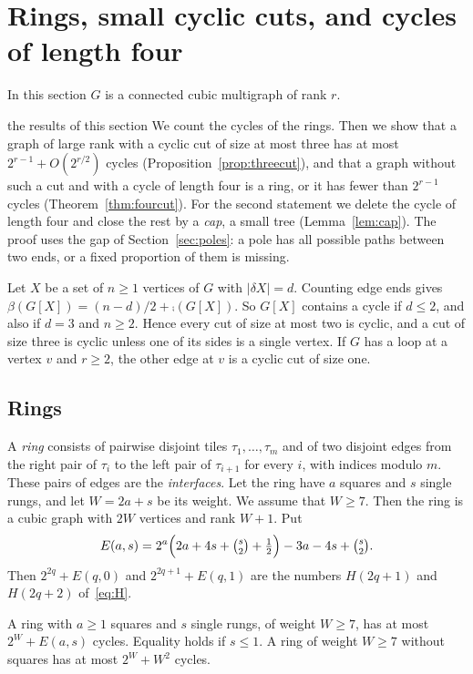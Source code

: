 \section{Rings, small cyclic cuts, and cycles of length four}\label{sec:cuts}

In this section $G$ is a connected cubic multigraph of rank $r$.

\begin{idea}{the results of this section}
We count the cycles of the rings. Then we show that a graph of large rank with a cyclic cut of
size at most three has at most $2^{r-1}+O(2^{r/2})$ cycles (Proposition~\ref{prop:threecut}), and
that a graph without such a cut and with a cycle of length four is a ring, or it has fewer than
$2^{r-1}$ cycles (Theorem~\ref{thm:fourcut}). For the second statement we delete the cycle of
length four and close the rest by a \emph{cap}, a small tree
(Lemma~\ref{lem:cap}). The proof uses the gap of Section~\ref{sec:poles}: a pole has all
possible paths between two ends, or a fixed proportion of them is missing.
\end{idea}

Let $X$ be a set of $n\ge1$ vertices of $G$ with $|\delta X|=d$. Counting edge ends gives
$\beta(G[X])=(n-d)/2+\comp(G[X])$. So $G[X]$ contains a cycle if $d\le2$, and also if $d=3$ and
$n\ge2$. Hence every cut of size at most two is cyclic, and a cut of size three is cyclic unless
one of its sides is a single vertex. If $G$ has a loop at a vertex $v$ and $r\ge2$, the other
edge at $v$ is a cyclic cut of size one.

\subsection{Rings}\label{sec:rings}

A \emph{ring} consists of pairwise disjoint tiles $\tau_1,\dots,\tau_m$ and of two disjoint edges
from the right pair of $\tau_i$ to the left pair of $\tau_{i+1}$ for every $i$, with indices modulo
$m$. These pairs of edges are the \emph{interfaces}. Let the ring have $a$ squares and $s$ single
rungs, and let $W=2a+s$ be its weight. We assume that $W\ge7$. Then the ring is a cubic graph with
$2W$ vertices and rank $W+1$. Put
\[
  E(a,s)=2^{a}\Bigl(2a+4s+\tbinom s2+\tfrac12\Bigr)-3a-4s+\tbinom s2 .
\]
Then $2^{2q}+E(q,0)$ and $2^{2q+1}+E(q,1)$ are the numbers $H(2q+1)$ and $H(2q+2)$
of~\eqref{eq:H}.

\begin{proposition}[Rings]\label{prop:rings}
A ring with $a\ge1$ squares and $s$ single rungs, of weight $W\ge7$, has at most $2^{W}+E(a,s)$
cycles. Equality holds if $s\le1$. A ring of weight
$W\ge7$ without squares has at most $2^{W}+W^{2}$ cycles.
\end{proposition}

